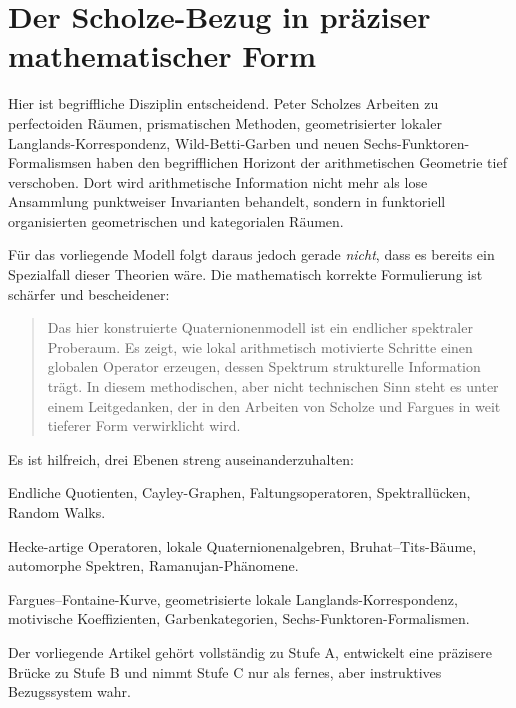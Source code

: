\documentclass[12pt,a4paper]{article}
\theoremstyle{plain}
\theoremstyle{definition}
\theoremstyle{remark}
\begin{document}
	\section{Der Scholze-Bezug in präziser mathematischer Form}
	
	Hier ist begriffliche Disziplin entscheidend.
	Peter Scholzes Arbeiten zu perfectoiden Räumen,
	prismatischen Methoden, geometrisierter lokaler Langlands-Korrespondenz,
	Wild-Betti-Garben und neuen Sechs-Funktoren-Formalismsen
	haben den begrifflichen Horizont der arithmetischen Geometrie tief verschoben.
	Dort wird arithmetische Information nicht mehr als lose Ansammlung
	punktweiser Invarianten behandelt,
	sondern in funktoriell organisierten geometrischen und kategorialen Räumen.
	
	Für das vorliegende Modell folgt daraus jedoch gerade \emph{nicht},
	dass es bereits ein Spezialfall dieser Theorien wäre.
	Die mathematisch korrekte Formulierung ist schärfer und bescheidener:
	
	\begin{quote}
		Das hier konstruierte Quaternionenmodell ist ein endlicher spektraler Proberaum.
		Es zeigt, wie lokal arithmetisch motivierte Schritte einen globalen Operator erzeugen,
		dessen Spektrum strukturelle Information trägt.
		In diesem methodischen, aber nicht technischen Sinn
		steht es unter einem Leitgedanken,
		der in den Arbeiten von Scholze und Fargues in weit tieferer Form verwirklicht wird.
	\end{quote}
	
	Es ist hilfreich, drei Ebenen streng auseinanderzuhalten:
	
	\begin{description}[leftmargin=2.3cm,style=nextline]
		\item[Stufe A.] Endliche Quotienten, Cayley-Graphen, Faltungsoperatoren,
		Spektrallücken, Random Walks.
		\item[Stufe B.] Hecke-artige Operatoren, lokale Quaternionenalgebren,
		Bruhat--Tits-Bäume, automorphe Spektren, Ramanujan-Phänomene.
		\item[Stufe C.] Fargues--Fontaine-Kurve, geometrisierte lokale Langlands-Korrespondenz,
		motivische Koeffizienten, Garbenkategorien, Sechs-Funktoren-Formalismen.
	\end{description}
	
	Der vorliegende Artikel gehört vollständig zu Stufe A,
	entwickelt eine präzisere Brücke zu Stufe B
	und nimmt Stufe C nur als fernes, aber instruktives Bezugssystem wahr.
	
\end{document}
